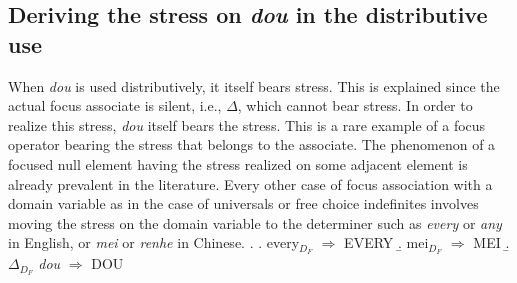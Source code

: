 \documentclass[12pt]{article}
\let\latextextsubscript\textsubscript
\let\textsubscript\latextextsubscript
\newcommand{\sub}[1]{\textsubscript{#1}}
\newcommand{\gap}[1]{\rule{1em}{0.4pt}\textsubscript{#1}}
\begin{document}
%
%
%
%
%
%
%
%


\subsection{Deriving the stress on \emph{dou} in the distributive use}
\label{sub:deriving_the_stress_on_dou_in_the_distributive_use}

When \emph{dou} is used distributively, it itself bears stress.
This is explained since the actual focus associate is silent, i.e., \(\Delta\), which cannot bear stress.
In order to realize this stress, \emph{dou} itself bears the stress.
This is a rare example of a focus operator bearing the stress that belongs to the associate.
The phenomenon of a focused null element having the stress realized on some adjacent element is already prevalent in the literature.
Every other case of focus association with a domain variable as in the case of universals or free choice indefinites involves moving the stress on the domain variable to the determiner such as \emph{every} or \emph{any} in English, or \emph{mei} or \emph{renhe} in Chinese.
\ex. \a. every\(_{D_F}\) \(\Longrightarrow\) EVERY
\b. mei\(_{D_F}\) \(\Longrightarrow\) MEI
\b. \(\Delta_{D_F}\) \emph{dou} \(\Longrightarrow\) DOU
\end{document}
